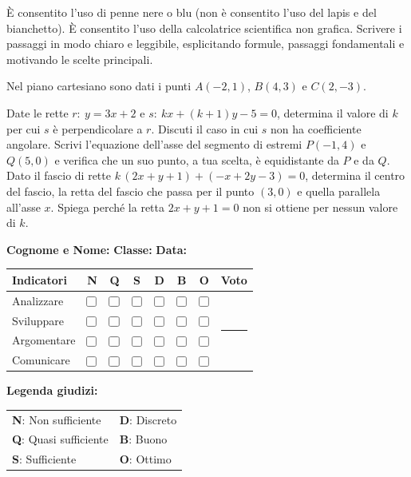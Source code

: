 \documentclass[a4paper,10pt]{exam}
\makeatletter
\newcommand{\cbox}{\ensuremath{\vcenter{\hbox{\tikz{\draw[black!75, line width=0.5pt, rounded corners=1.2pt] (0,0) rectangle (3.0mm, 3.0mm);}}}}}
\newcommand{\grigliacompetenze}{
\vspace{1mm}
\noindent
\begin{minipage}[c]{0.62\linewidth}
\footnotesize
\setlength{\aboverulesep}{0pt}
\setlength{\belowrulesep}{0pt}
\renewcommand{\arraystretch}{1.25}
\begin{tabular}{l cc >{\columncolor{gray!20}}c ccc c}
\toprule
\rowcolor{gray!10}
\textbf{Indicatori} & \textbf{N} & \textbf{Q} & \cellcolor{gray!20}\textbf{S} & \textbf{D} & \textbf{B} & \textbf{O} & \textbf{Voto} \\
\midrule
Analizzare    & \cbox & \cbox & \cbox & \cbox & \cbox & \cbox & \multirow{4}{*}{\rule{1.4cm}{0pt}} \\
Sviluppare    & \cbox & \cbox & \cbox & \cbox & \cbox & \cbox & \\
Argomentare   & \cbox & \cbox & \cbox & \cbox & \cbox & \cbox & \\
Comunicare    & \cbox & \cbox & \cbox & \cbox & \cbox & \cbox & \\
\bottomrule
\end{tabular}
\end{minipage}\hfill
\begin{minipage}[c]{0.35\linewidth}
\scriptsize \color{black!75}
\textbf{Legenda giudizi:}\par\vspace{1mm}
\begin{tabular}{@{}ll@{}}
\textbf{N}: Non sufficiente & \textbf{D}: Discreto \\
\textbf{Q}: Quasi sufficiente & \textbf{B}: Buono \\
\textbf{S}: Sufficiente & \textbf{O}: Ottimo \\
\end{tabular}
\end{minipage}
}
\makeatother
\begin{document}
\begin{tcolorbox}[istruzionibox]
È consentito l'uso di penne nere o blu (non è consentito l'uso del lapis e del bianchetto).
È consentito l'uso della calcolatrice scientifica non grafica.
Scrivere i passaggi in modo chiaro e leggibile, esplicitando formule, passaggi fondamentali e motivando le scelte principali.
\end{tcolorbox}

\vspace{1.5mm}


\begin{questions}
\question Nel piano cartesiano sono dati i punti $A(-2,1)$, $B(4,3)$ e $C(2,-3)$.
\question Date le rette $r:\ y=3x+2$ e $s:\ kx+(k+1)y-5=0$, determina il valore di $k$ per cui $s$ è perpendicolare a $r$. Discuti il caso in cui $s$ non ha coefficiente angolare.
\question Scrivi l'equazione dell'asse del segmento di estremi $P(-1,4)$ e $Q(5,0)$ e verifica che un suo punto, a tua scelta, è equidistante da $P$ e da $Q$.
\question Dato il fascio di rette $k\,(2x+y+1)+(-x+2y-3)=0$, determina il centro del fascio, la retta del fascio che passa per il punto $(3,0)$ e quella parallela all'asse $x$. Spiega perché la retta $2x+y+1=0$ non si ottiene per nessun valore di $k$.
\end{questions}
\null
\vfill

\noindent
\textbf{Cognome e Nome:}\enspace\hrulefill\hspace{1cm}%
\textbf{Classe:}\enspace\makebox[2.5cm]{\hrulefill}\hspace{1cm}%
\textbf{Data:}\enspace\makebox[2.5cm]{\hrulefill}

\vspace{3mm}
\grigliacompetenze
\end{document}
